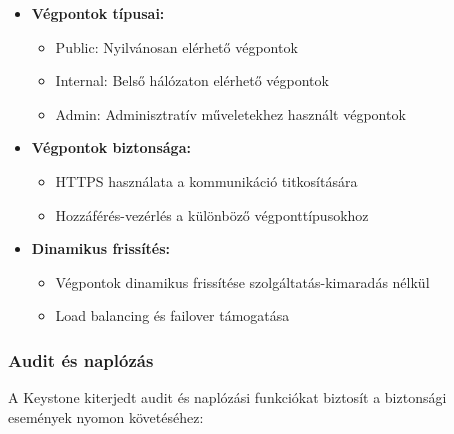 \documentclass[a4paper,12pt]{article}
\begin{document}
    \begin{itemize}
        \item \textbf{Végpontok típusai:}
        \begin{itemize}
            \item Public: Nyilvánosan elérhető végpontok
            \item Internal: Belső hálózaton elérhető végpontok
            \item Admin: Adminisztratív műveletekhez használt végpontok
        \end{itemize}

        \item \textbf{Végpontok biztonsága:}
        \begin{itemize}
            \item HTTPS használata a kommunikáció titkosítására
            \item Hozzáférés-vezérlés a különböző végponttípusokhoz
        \end{itemize}

        \item \textbf{Dinamikus frissítés:}
        \begin{itemize}
            \item Végpontok dinamikus frissítése szolgáltatás-kimaradás nélkül
            \item Load balancing és failover támogatása
        \end{itemize}
    \end{itemize}

    \subsubsection{Audit és naplózás}

    A Keystone kiterjedt audit és naplózási funkciókat biztosít a biztonsági események nyomon követéséhez:
\end{document}
